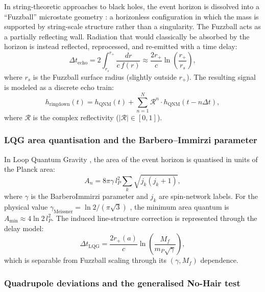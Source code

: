 \documentclass[11pt,a4paper, english]{book}
\theoremstyle{plain}
\theoremstyle{definition}
\numberwithin{equation}{chapter}
\numberwithin{figure}{chapter}
\numberwithin{table}{chapter}
\begin{document}
In string-theoretic approaches to black holes, the event horizon is
dissolved into a ``Fuzzball'' microstate geometry \cite{Mathur_2005}: a
horizonless configuration in which the mass is supported by string-scale
structure rather than a singularity.  The Fuzzball acts as a partially
reflecting wall.  Radiation that would classically be absorbed by the horizon
is instead reflected, reprocessed, and re-emitted with a time delay:
\begin{equation}
  \label{eq:fuzzball_delay}
  \Delta t_\mathrm{echo} = 2\int_{r_s}^{r_+}
    \frac{dr}{c\,f(r)} \approx \frac{2r_+}{c}\ln\!\left(\frac{r_+}{r_s}\right),
\end{equation}
where $r_s$ is the Fuzzball surface radius (slightly outside $r_+$).  The
resulting signal is modeled as a discrete echo train:
\begin{equation}
  \label{eq:echo_train}
  h_\mathrm{ringdown}(t) = h_\mathrm{QNM}(t)
    + \sum_{n=1}^{N} \mathcal{R}^n \cdot h_\mathrm{QNM}(t - n\Delta t),
\end{equation}
where $\mathcal{R}$ is the complex reflectivity ($|\mathcal{R}|\in[0,1]$).

\subsubsection{LQG area quantisation and the Barbero--Immirzi parameter}

In Loop Quantum Gravity \cite{Ashtekar_2004}, the area of the event horizon
is quantised in units of the Planck area:
\begin{equation}
  \label{eq:lqg_area}
  A_n = 8\pi\gamma\,l_P^2\sum_k\sqrt{j_k(j_k+1)},
\end{equation}
where $\gamma$ is the BarberoImmirzi parameter and $j_k$ are spin-network
labels.  For the physical value $\gamma_\mathrm{Meissner} = \ln 2/(\pi\sqrt{3})$
\cite{Meissner_2004}, the minimum area quantum is $A_\mathrm{min} \approx
4\ln2\,l_P^2$. The induced line-structure correction is represented through the delay model:
\begin{equation}
  \label{eq:lqg_correction}
  \Delta t_\mathrm{LQG} =
    \frac{2r_+(a)}{c}\ln\!\left(\frac{M_f}{m_P\sqrt{\gamma}}\right),
\end{equation}
which is separable from Fuzzball scaling through its $(\gamma,M_f)$ dependence.

\subsubsection{Quadrupole deviations and the generalised No-Hair test}
\end{document}
